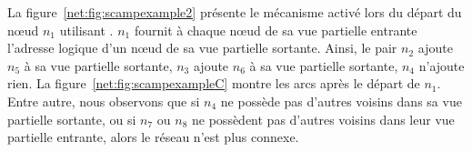 \begin{itemize}
  La figure~\ref{net:fig:scampexample2} présente le mécanisme activé lors du
  départ du nœud $n_1$ utilisant \SCAMP. $n_1$ fournit à chaque nœud de sa vue
  partielle entrante l'adresse logique d'un nœud de sa vue partielle
  sortante. Ainsi, le pair $n_2$ ajoute $n_5$ à sa vue partielle sortante, $n_3$
  ajoute $n_6$ à sa vue partielle sortante, $n_4$ n'ajoute rien. La
  figure~\ref{net:fig:scampexampleC} montre les arcs après le départ de
  $n_1$. Entre autre, nous observons que si $n_4$ ne possède pas d'autres
  voisins dans sa vue partielle sortante, ou si $n_7$ ou $n_8$ ne possèdent pas
  d'autres voisins dans leur vue partielle entrante, alors le réseau n'est plus
  connexe.
\end{itemize}


